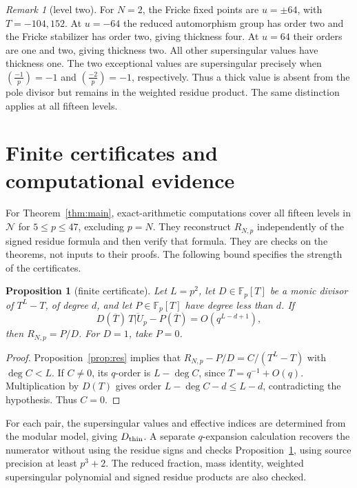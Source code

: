 \documentclass[11pt,a4paper]{article}
\numberwithin{equation}{section}
\newtheorem{proposition}[theorem]{Proposition}
\theoremstyle{definition}
\theoremstyle{remark}
\newtheorem{remark}[theorem]{Remark}
\newcommand{\Fp}{\mathbb F_p}
\begin{document}
\begin{remark}[level two]
For $N=2$, the Fricke fixed points are $u=\pm64$, with $T=-104,152$.
At $u=-64$ the reduced automorphism group has order two and the Fricke stabilizer
has order two, giving thickness four. At $u=64$ their orders are one and two,
giving thickness two. All other supersingular values have thickness one.
The two exceptional values are supersingular precisely when
$\left(\frac{-1}{p}\right)=-1$ and $\left(\frac{-2}{p}\right)=-1$, respectively.
Thus a thick value is absent from the pole divisor but remains in the
weighted residue product. The same distinction applies at all fifteen levels.
\end{remark}

\section{Finite certificates and computational evidence}\label{sec:comp}
For Theorem~\ref{thm:main}, exact-arithmetic computations cover all fifteen
levels in $\mathcal N$ for $5\le p\le47$, excluding $p=N$. They reconstruct
$R_{N,p}$ independently of the signed residue formula and then verify
that formula. They are checks on the theorems, not inputs to their proofs.
The following bound specifies the strength of the certificates.

\begin{proposition}[finite certificate]\label{prop:certificate}
Let $L=p^2$, let $D\in\Fp[T]$ be a monic divisor of $T^L-T$, of degree $d$, and
let $P\in\Fp[T]$ have degree less than $d$. If
\[
D(\overline T)\,\overline{T|U_p}-P(\overline T)=O(q^{L-d+1}),
\]
then $R_{N,p}=P/D$. For $D=1$, take $P=0$.
\end{proposition}
\begin{proof}
Proposition~\ref{prop:res} implies that
$R_{N,p}-P/D=C/(T^L-T)$ with $\deg C<L$.
If $C\ne0$, its $q$-order is $L-\deg C$, since $T=q^{-1}+O(q)$.
Multiplication by $D(T)$ gives order $L-\deg C-d\le L-d$, contradicting the
hypothesis. Thus $C=0$.
\end{proof}

For each pair, the supersingular values and effective indices are determined
from the modular model, giving $D_{\rm thin}$. A separate $q$-expansion
calculation recovers the numerator without using the residue signs and
checks Proposition~\ref{prop:certificate}, using source precision at least
$p^3+2$. The reduced fraction, mass identity, weighted supersingular
polynomial and signed residue products are also checked.
\end{document}
